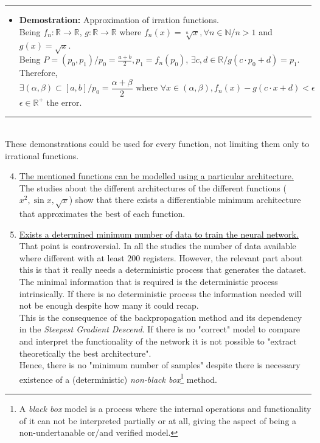 \documentclass[a4paper, 11pt]{article}
\begin{document}
\begin{enumerate}
    \rule{\linewidth}{0.4pt}
    \begin{itemize}
        \item \textbf{Demostration:} Approximation of irration functions.\\
 Being $f_n:\mathbb{R}\rightarrow\mathbb{R}$, $g:\mathbb{R}\rightarrow\mathbb{R}$ where $f_n(x) = \sqrt[n]{x}, \forall n \in \mathbb{N} / n > 1$ and $g(x) = \sqrt{x}$.\\
 Being $P=(p_0, p_1) / p_0 = \frac{a+b}{2}, p_1 = f_n(p_0)$, $\exists c,d\in\mathbb{R} / g(c\cdot p_0 + d) = p_1$.
 Therefore, 
        $$\exists (\alpha, \beta) \subset [a,b] / p_0 = \frac{\alpha + \beta}{2} \text{ where } \forall x \in (\alpha, \beta), f_n(x) - g(c\cdot x + d) < \epsilon$$
        $\epsilon\in\mathbb{R^+}$ the error.
    \end{itemize}
    \rule{\linewidth}{0.4pt}\\
 These demonstrations could be used for every function, not limiting them only to irrational functions.
\end{enumerate}
\begin{enumerate}
    \setcounter{enumi}{3}
    \item \underline{The mentioned functions can be modelled using a particular architecture.}\\
 The studies about the different architectures of the different functions ($x^2, \sin{x}, \sqrt{x}$) show that there exists a differentiable minimum architecture that approximates the best of each function.\\
    \item \underline{Exists a determined minimum number of data to train the neural network.}\\
 That point is controversial. In all the studies the number of data available where different with at least $200$ registers. However, the relevant part about this is that it really needs a deterministic process that generates the dataset.\\
 The minimal information that is required is the deterministic process intrinsically. If there is no deterministic process the information needed will not be enough despite how many it could recap.\\
 This is the consequence of the backpropagation method and its dependency in the \textit{Steepest Gradient Descend}. If there is no "correct" model to compare and interpret the functionality of the network it is not possible to "extract theoretically the best architecture".\\
 Hence, there is no "minimum number of samples" despite there is necessary existence of a (deterministic) \textit{non-black box}\footnote{A \textit{black box} model is a process where the internal operations and functionality of it can not be interpreted partially or at all, giving the aspect of being a non-undertanable or/and verified model.} method.
\end{enumerate}
\end{document}
